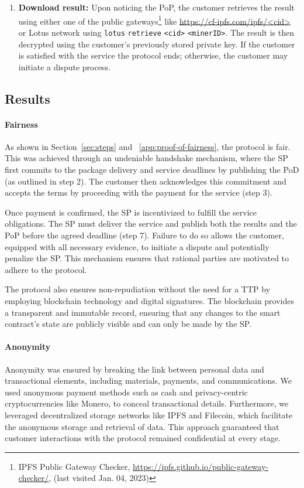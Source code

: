 \documentclass[pdftex,twocolumn,epjc3]{svjour3}
\begin{document}
\begin{enumerate}
  \item \textbf{Download result:} Upon noticing the PoP, the customer retrieves the result using either one of the public gateways\footnote{IPFS Public Gateway Checker, \url{https://ipfs.github.io/public-gateway-checker/}, (last visited Jan. 04, 2023)} like \url{https://cf-ipfs.com/ipfs/<cid>} or Lotus network using \texttt{lotus} \texttt{retrieve} \texttt{<cid>} \texttt{<minerID>}. The result is then decrypted using the customer's previously stored private key. If the customer is satisfied with the service the protocol ends; otherwise, the customer may initiate a dispute process.
  
\end{enumerate}

\subsection{Results}

\paragraph{Fairness}
As shown in Section~\ref{sec:steps} and ~\ref{app:proof-of-fairness}, the protocol is fair. This was achieved through an undeniable handshake mechanism, where the SP first commits to the package delivery and service deadlines by publishing the PoD (as outlined in step 2). The customer then acknowledges this commitment and accepts the terms by proceeding with the payment for the service (step 3).

Once payment is confirmed, the SP is incentivized to fulfill the service obligations. The SP must deliver the service and publish both the results and the PoP before the agreed deadline (step 7). Failure to do so allows the customer, equipped with all necessary evidence, to initiate a dispute and potentially penalize the SP. This mechanism ensures that rational parties are motivated to adhere to the protocol.

The protocol also ensures non-repudiation without the need for a TTP by employing blockchain technology and digital signatures. The blockchain provides a transparent and immutable record, ensuring that any changes to the smart contract's state are publicly visible and can only be made by the SP.


\paragraph{Anonymity}
\begin{sloppypar}
Anonymity was ensured by breaking the link between personal data and transactional elements, including materials, payments, and communications. We used anonymous payment methods such as cash and privacy-centric cryptocurrencies like Monero, to conceal transactional details. Furthermore, we leveraged decentralized storage networks like IPFS and Filecoin, which facilitate the anonymous storage and retrieval of data. This approach guaranteed that customer interactions with the protocol remained confidential at every stage.
\end{sloppypar}
\end{document}
